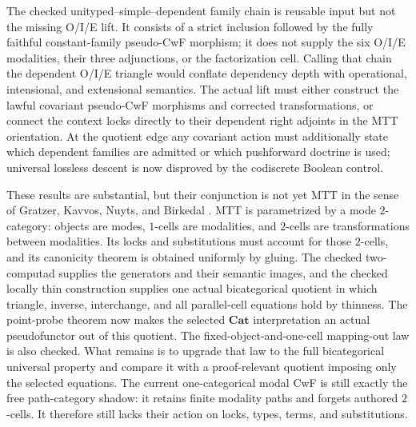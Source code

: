 \documentclass[11pt]{article}
\theoremstyle{definition}
\theoremstyle{remark}
\begin{document}
The checked unityped--simple--dependent family chain is reusable input but not
the missing O/I/E lift.  It consists of a strict inclusion followed by the
fully faithful constant-family pseudo-CwF morphism; it does not supply the six
O/I/E modalities, their three adjunctions, or the factorization cell.  Calling
that chain the dependent O/I/E triangle would conflate dependency depth with
operational, intensional, and extensional semantics.  The actual lift must
either construct the lawful covariant pseudo-CwF morphisms and corrected
transformations, or connect the context locks directly to their dependent right
adjoints in the MTT orientation.  At the quotient edge any covariant action
must additionally state which dependent families are admitted or which
pushforward doctrine is used; universal lossless descent is now disproved by
the codiscrete Boolean control.

These results are substantial, but their conjunction is not yet MTT in the
sense of Gratzer, Kavvos, Nuyts, and Birkedal
\cite{GratzerKavvosNuytsBirkedalMTT}.  MTT is parametrized by a mode
$2$-category: objects are modes, $1$-cells are modalities, and $2$-cells are
transformations between modalities.  Its locks and substitutions must account
for those $2$-cells, and its canonicity theorem is obtained uniformly by
gluing.  The checked two-computad supplies the generators and their semantic
images, and the checked locally thin construction supplies one actual
bicategorical quotient in which triangle, inverse, interchange, and all
parallel-cell equations hold by thinness.  The point-probe theorem now makes
the selected $\mathbf{Cat}$ interpretation an actual pseudofunctor out of this
quotient.  The fixed-object-and-one-cell mapping-out law is also checked.  What
remains is to upgrade that law to the full bicategorical universal property and
compare it with a proof-relevant quotient imposing only the selected equations.
The current one-categorical modal CwF is still exactly
the free path-category shadow: it retains finite modality paths and forgets
authored $2$-cells.  It therefore still lacks their action on locks, types,
terms, and substitutions.
\end{document}
